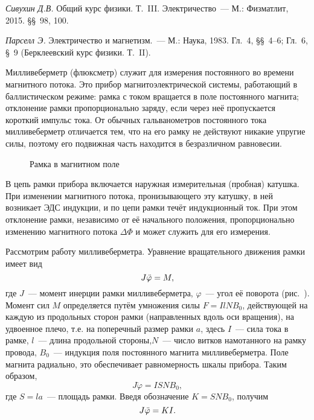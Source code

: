 \begin{lab:literature}

\item{ \emph{Сивухин Д.В.} Общий курс физики. Т.~III. Электричество~--- М.: Физматлит, 2015. \S\S~98, 100.}

\item{ \emph{Парселл Э.} Электричество и магнетизм.~--- М.: Наука, 1983. Гл.~4, \S\S~4--6; Гл.~6, \S~9 (Берклеевский курс физики. Т.~II).}

\end{lab:literature}

\newpage

\label{MWB}


Милливеберметр (флюксметр) служит для измерения постоянного во времени магнитного потока. Это прибор
магнитоэлектрической системы, работающий в баллистическом режиме: рамка с током вращается в поле постоянного магнита; отклонение рамки пропорционально заряду, если через неё пропускается короткий импульс тока. От обычных гальванометров постоянного тока милливеберметр отличается тем, что на его рамку не действуют никакие упругие силы, поэтому его подвижная часть находится в безразличном равновесии.

\begin{figure}[h!]
	\caption{Рамка в магнитном поле}
\end{figure}

В цепь рамки прибора включается наружная измерительная (пробная) катушка. При изменении магнитного потока,
пронизывающего эту катушку, в ней возникает ЭДС индукции, и по цепи рамки течёт индукционный ток. При этом отклонение рамки, независимо от её начального положения, пропорционально изменению магнитного потока $\Delta\Phi$ и может служить для его измерения.

Рассмотрим работу милливеберметра. Уравнение вращательного движения рамки имеет вид
\begin{equation}
	J\ddot{\varphi}=M,
	\eqmark{MWB.1}
\end{equation}
где $J$~--- момент инерции рамки милливеберметра, $\varphi$~--- угол её поворота (рис.~). Момент сил $M$ определяется путём умножения силы $F=IlNB_0$, действующей на каждую из продольных сторон рамки (направленных вдоль оси вращения), на удвоенное плечо, т.е. на поперечный размер рамки $a$, здесь $I$~--- сила тока в рамке, $l$~--- длина продольной стороны,$N$~--- число витков намотанного на рамку провода, $B_0$~--- индукция поля постоянного магнита милливеберметра. Поле магнита радиально, это обеспечивает равномерность шкалы прибора. Таким образом,
\begin{equation*}
	J\ddot{\varphi}=ISNB_0,
\end{equation*}
где $S=la$~--- площадь рамки. Введя обозначение $K=SNB_0$, получим
\begin{equation}
	J\ddot{\varphi}=KI.
	\eqmark{MWB.2}
\end{equation}

